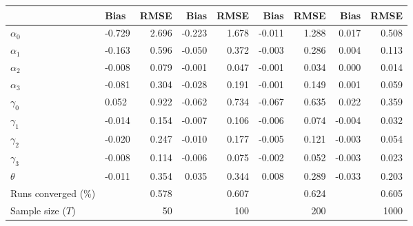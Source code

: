 
\begin{tabular}[t]{llrrrrrrr}
\toprule
  & Bias & RMSE & Bias & RMSE & Bias & RMSE & Bias & RMSE\\
\midrule
$\alpha_{0}$ & -0.729 & 2.696 & -0.223 & 1.678 & -0.011 & 1.288 & 0.017 & 0.508\\
$\alpha_{1}$ & -0.163 & 0.596 & -0.050 & 0.372 & -0.003 & 0.286 & 0.004 & 0.113\\
$\alpha_{2}$ & -0.008 & 0.079 & -0.001 & 0.047 & -0.001 & 0.034 & 0.000 & 0.014\\
$\alpha_{3}$ & -0.081 & 0.304 & -0.028 & 0.191 & -0.001 & 0.149 & 0.001 & 0.059\\
$\gamma_{0}$ & 0.052 & 0.922 & -0.062 & 0.734 & -0.067 & 0.635 & 0.022 & 0.359\\
$\gamma_{1}$ & -0.014 & 0.154 & -0.007 & 0.106 & -0.006 & 0.074 & -0.004 & 0.032\\
$\gamma_{2}$ & -0.020 & 0.247 & -0.010 & 0.177 & -0.005 & 0.121 & -0.003 & 0.054\\
$\gamma_{3}$ & -0.008 & 0.114 & -0.006 & 0.075 & -0.002 & 0.052 & -0.003 & 0.023\\
$\theta$ & -0.011 & 0.354 & 0.035 & 0.344 & 0.008 & 0.289 & -0.033 & 0.203\\
Runs converged (\%) &  & 0.578 &  & 0.607 &  & 0.624 &  & 0.605\\
Sample size ($T$) &  & 50 &  & 100 &  & 200 &  & 1000\\
\bottomrule
\end{tabular}
